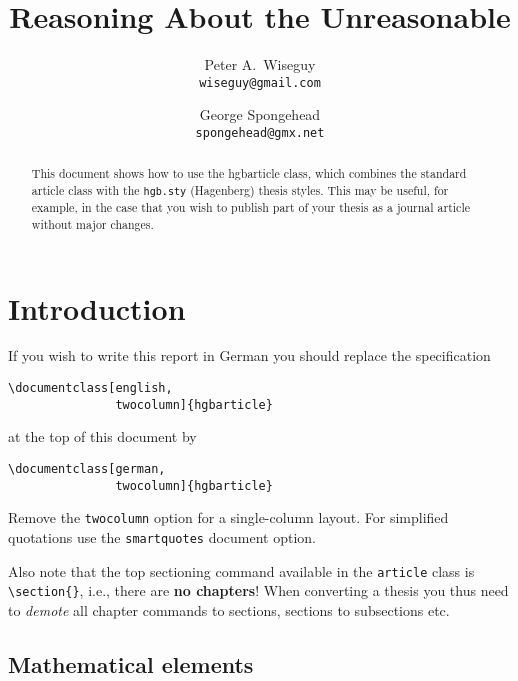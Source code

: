 \documentclass[english,twocolumn]{hgbarticle}
\author{
Peter A.\ Wiseguy\\ 
\texttt{wiseguy@gmail.com}
\and
George Spongehead\\
\texttt{spongehead@gmx.net}}
\title{Reasoning About the Unreasonable}
\date{}
\begin{document}
\maketitle

\begin{abstract}\noindent
This document shows how to use the \textsf{hgbarticle} class, which combines the standard \latex \textsf{article} class
with the \texttt{hgb.sty} (Hagenberg) thesis styles. 
This may be useful, for example, in the case that you wish to publish
part of your thesis as a journal article without major changes.
\end{abstract}


\section{Introduction}

If you wish to write this report in German
you should replace the specification
\begin{verbatim}
\documentclass[english,
               twocolumn]{hgbarticle}
\end{verbatim}
at the top of this document by
\begin{verbatim}
\documentclass[german,
               twocolumn]{hgbarticle}
\end{verbatim}
%
Remove the \texttt{twocolumn} option for a single-column layout.
For simplified quotations use the \texttt{smartquotes} document option.

Also note that the top sectioning command available in the \texttt{article} class
is \verb!\section{}!, i.e., there are \textbf{no chapters}!
When converting a thesis you thus need to \emph{demote} all chapter commands to
sections, sections to subsections etc.

\subsection{Mathematical elements}
\end{document}
